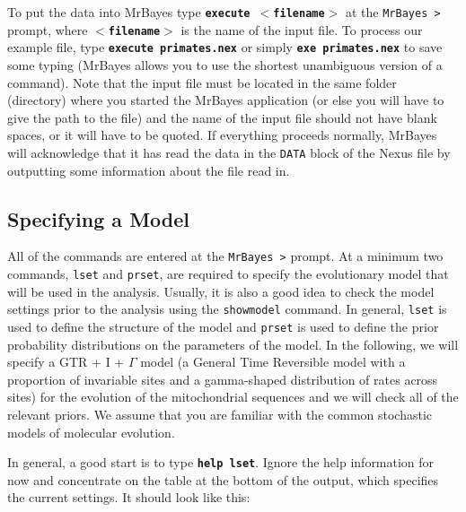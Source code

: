 \documentclass[12pt]{book}
\newcommand{\ttt}[1]{\texttt{#1}}
\newcommand{\tb}[1]{\ttt{\textbf{#1}}}
\begin{document}
To put the data into MrBayes type \tb{execute $<$filename$>$} at the \texttt{MrBayes >} prompt,
where \tb{$<$filename$>$} is the name of the input file. To process our example file, type
\tb{execute primates.nex} or simply \tb{exe primates.nex} to save some typing (MrBayes allows you
to use the shortest unambiguous version of a command). Note that the input file must be located in
the same folder (directory) where you started the MrBayes application (or else you will have to
give the path to the file) and the name of the input file should not have blank spaces, or it will
have to be quoted. If everything proceeds normally, MrBayes will acknowledge that it has read the
data in the \texttt{DATA} block of the Nexus file by outputting some information about the file
read in.

\subsection{Specifying a Model}

All of the commands are entered at the \texttt{MrBayes >} prompt. At a minimum two commands,
\texttt{lset} and \texttt{prset}, are required to specify the evolutionary model that will be used
in the analysis. Usually, it is also a good idea to check the model settings prior to the analysis
using the \texttt{showmodel} command. In general, \texttt{lset} is used to define the structure of
the model and \texttt{prset} is used to define the prior probability distributions on the
parameters of the model. In the following, we will specify a GTR + I + $\Gamma$ model (a General
Time Reversible model with a proportion of invariable sites and a gamma-shaped distribution of
rates across sites) for the evolution of the mitochondrial sequences and we will check all of the
relevant priors. We assume that you are familiar with the common stochastic models of molecular
evolution.

In general, a good start is to type \tb{help lset}. Ignore the help information for now and
concentrate on the table at the bottom of the output, which specifies the current settings. It
should look like this:
\end{document}
